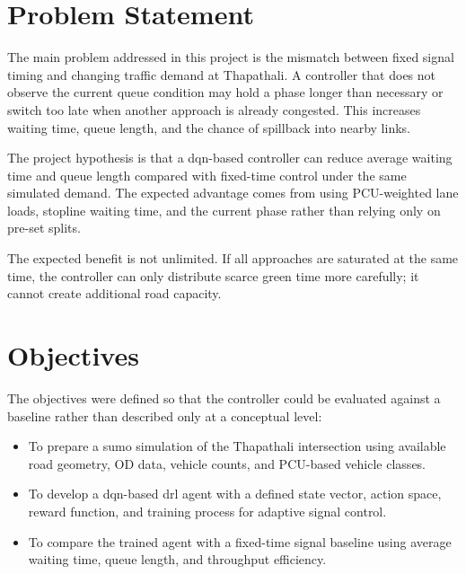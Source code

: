 \section{Problem Statement}
\label{sec:problem_statement}

The main problem addressed in this project is the mismatch between fixed signal timing and changing traffic demand at Thapathali. A controller that does not observe the current queue condition may hold a phase longer than necessary or switch too late when another approach is already congested. This increases waiting time, queue length, and the chance of spillback into nearby links.

The project hypothesis is that a \gls{dqn}-based controller can reduce
average waiting time and queue length compared with fixed-time control
under the same simulated demand. The expected advantage comes from using
PCU-weighted lane loads, stopline waiting time, and the current phase
rather than relying only on pre-set splits.

The expected benefit is not unlimited. If all approaches are saturated at
the same time, the controller can only distribute scarce green time more
carefully; it cannot create additional road capacity.

\section{Objectives}
\label{sec:objectives}

The objectives were defined so that the controller could be evaluated against a baseline rather than described only at a conceptual level:

\begin{itemize}
    \item To prepare a \gls{sumo} simulation of the Thapathali intersection using available road geometry, OD data, vehicle counts, and PCU-based vehicle classes.
    \item To develop a \gls{dqn}-based \gls{drl} agent with a defined state vector, action space, reward function, and training process for adaptive signal control.
    \item To compare the trained agent with a fixed-time signal baseline using average waiting time, queue length, and throughput efficiency.
\end{itemize}

